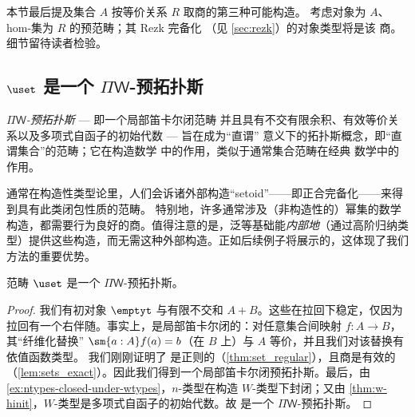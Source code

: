 本节最后提及集合 $A$ 按等价关系 $R$ 取商的第三种可能构造。
考虑对象为 $A$、hom-集为 $R$ 的预范畴；其 Rezk 完备化
%
（见 \cref{sec:rezk}）的对象类型将是该
商。细节留待读者检验。

%
%
%

\subsection{\texorpdfstring{$\uset$}{Set} 是一个 \texorpdfstring{$\Pi\mathsf{W}$}{ΠW}-预拓扑斯}
\label{subsec:piw}

%

\emph{$\Pi\mathsf{W}$-预拓扑斯}
%
--- 即一个局部笛卡尔闭范畴
%
%
并且具有不交有限余积、有效等价关系以及多项式自函子的初始代数 --- 旨在成为“直谓”
%
意义下的拓扑斯概念，即“直谓集合”的范畴；它在构造数学%
中的作用，类似于通常集合范畴在经典%
数学中的作用。

通常在构造性类型论里，人们会诉诸外部构造“setoid”——即正合完备化——来得到具有此类闭包性质的范畴。
%
特别地，许多通常涉及（非构造性的）幂集的数学构造，都需要行为良好的商。值得注意的是，泛等基础能\emph{内部地}（通过高阶归纳类型）提供这些构造，而无需这种外部构造。正如后续例子将展示的，这体现了我们方法的重要优势。

\begin{thm}
  范畴 $\uset$ 是一个 $\Pi\mathsf{W}$-预拓扑斯。
\end{thm}
\begin{proof}
  我们有初对象
  $\emptyt$ 与有限不交和 $A+B$。这些在拉回下稳定，仅因为拉回有一个右伴随。事实上，\uset 是局部笛卡尔闭的：对任意集合间映射 $f:A\to B$，其“纤维化替换” $\sm{a:A}f(a)=b$（在 $B$ 上）与 $A$ 等价，并且我们对该替换有依值函数类型。
我们刚刚证明了 \uset 是正则的（\cref{thm:set_regular}），且商是有效的（\cref{lem:sets_exact}）。因此我们得到一个局部笛卡尔闭预拓扑斯。最后，由 \cref{ex:ntypes-closed-under-wtypes}，$n$-类型在构造 $W$-类型下封闭；又由 \cref{thm:w-hinit}，$W$-类型是多项式自函子的初始代数。故 \uset 是一个 $\Pi\mathsf{W}$-预拓扑斯。
\end{proof}


